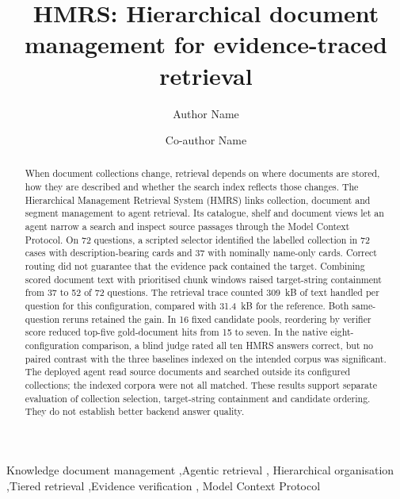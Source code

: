 \documentclass[review,12pt]{elsarticle}
\begin{document}
\begin{frontmatter}

\title{HMRS: Hierarchical document management for evidence-traced retrieval}

\author[inst1]{Author Name}
\author[inst1]{Co-author Name}

\begin{abstract}
When document collections change, retrieval depends on where documents are
stored, how they are described and whether the search index reflects those
changes. The Hierarchical Management Retrieval System (HMRS) links
collection, document and segment management to agent retrieval. Its
catalogue, shelf and document views let an agent narrow a search and
inspect source passages through the Model Context Protocol. On 72
questions, a scripted selector identified the labelled collection in
72 cases with description-bearing cards and 37 with nominally name-only
cards. Correct routing did not guarantee that the evidence pack contained
the target. Combining scored document text with prioritised chunk windows
raised target-string containment from 37 to 52 of 72 questions. The
retrieval trace counted 309~kB of text handled per question for this
configuration, compared with 31.4~kB for the reference.
Both same-question reruns retained the gain. In 16 fixed candidate pools,
reordering by verifier score reduced top-five gold-document hits from 15
to seven. In the native eight-configuration comparison, a blind judge
rated all ten HMRS answers correct, but no paired contrast with the three
baselines indexed on the intended corpus was significant. The deployed
agent read source documents and searched outside its configured
collections; the indexed corpora were not all matched. These results support
separate evaluation of collection selection, target-string containment and
candidate ordering. They do not establish better backend answer quality.
\end{abstract}

\begin{keyword}
Knowledge document management \sep Agentic retrieval \sep
Hierarchical organisation \sep Tiered retrieval \sep Evidence verification \sep
Model Context Protocol
\end{keyword}

\end{frontmatter}

















{\ifdefined\HMRSReviewLayout\else\footnotesize\fi
\renewcommand{\baselinestretch}{0.90}\selectfont
\setlength{\bibsep}{-0.3pt plus 0.05ex}


}
\end{document}
